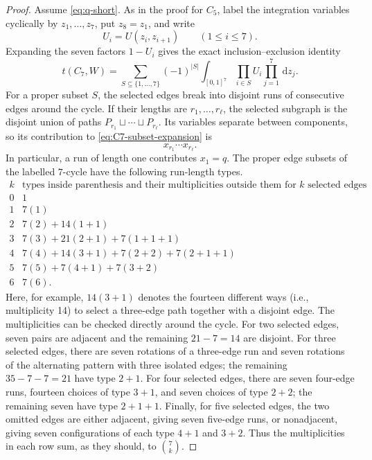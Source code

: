 \documentclass[11pt]{article}
\newcommand{\dd}{\,\mathrm d}
\begin{document}
\begin{proof}
Assume \eqref{eq:q-short}.  As in the proof for \(C_5\), label the integration
variables cyclically by \(z_1,\ldots,z_7\), put \(z_8=z_1\), and write
\[
       U_i=U(z_i,z_{i+1})\qquad(1\le i\le7).
\]
Expanding the seven factors \(1-U_i\) gives the exact inclusion--exclusion
identity
\begin{equation}\label{eq:C7-subset-expansion}
 t(C_7,W)
 =\sum_{S\subseteq\{1,\ldots,7\}}(-1)^{|S|}
   \int_{[0,1]^7}\prod_{i\in S}U_i\prod_{j=1}^7\dd z_j.
\end{equation}
For a proper subset \(S\), the selected edges break into disjoint runs of
consecutive edges around the cycle.  If their lengths are
\(r_1,\ldots,r_\ell\), the selected subgraph is the disjoint union of paths
\(P_{r_1}\sqcup\cdots\sqcup P_{r_\ell}\).  Its variables separate between
components, so its contribution to \eqref{eq:C7-subset-expansion} is
\[
       x_{r_1}\cdots x_{r_\ell}.
\]
In particular, a run of length one contributes \(x_1=q\).  The proper edge
subsets of the labelled \(7\)-cycle have the following run-length types.
\[
\begin{array}{c|l}
 k&\text{types inside parenthesis and their multiplicities outside them for }k\text{ selected edges}\\
\hline
0&1\\
1&7(1)\\
2&7(2)+14(1+1)\\
3&7(3)+21(2+1)+7(1+1+1)\\
4&7(4)+14(3+1)+7(2+2)+7(2+1+1)\\
5&7(5)+7(4+1)+7(3+2)\\
6&7(6).
\end{array}
\]
Here, for example, \(14(3+1)\) denotes 
the fourteen different ways (i.e., multiplicity 14) to select a three-edge path together with a
disjoint edge.  The multiplicities can be checked directly around the
cycle.  For two selected edges, seven pairs are adjacent and the remaining
\(21-7=14\) are disjoint.  For three selected edges, there are seven
rotations of a three-edge run and seven rotations of the alternating pattern
with three isolated edges; the remaining \(35-7-7=21\) have type \(2+1\).
For four selected edges, there are seven four-edge runs, fourteen choices of
type \(3+1\), and seven choices of type \(2+2\); the remaining seven have
type \(2+1+1\).  Finally, for five selected edges, the two omitted edges are
either adjacent, giving seven five-edge runs, or nonadjacent, giving seven
configurations of each type \(4+1\) and \(3+2\).  Thus the multiplicities in
each row sum, as they should, to \(\binom7k\).


\end{proof}
\end{document}

